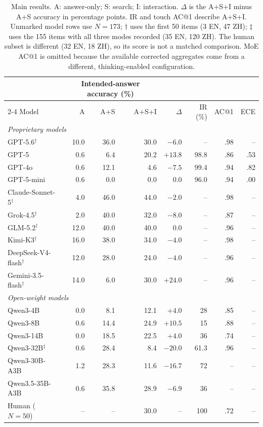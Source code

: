 \begin{table}[t]
\centering
\small
\begin{tabular*}{\textwidth}{@{\extracolsep{\fill}}lrrrrrrr@{}}
\toprule
& \multicolumn{3}{c}{Intended-answer accuracy (\%)} & & & & \\
\cmidrule(lr){2-4}
Model & A & A+S & A+S+I & $\Delta$ & IR (\%) & AC@1 & ECE \\
\midrule
\multicolumn{8}{l}{\textit{Proprietary models}} \\
GPT-5.6$^{\dagger}$           & 10.0 & 36.0 & 30.0 & $-6.0$  & -- & .98 & -- \\
GPT-5                         & 0.6 & 6.4 & 20.2 & $+13.8$ & 98.8 & .86 & .53 \\
GPT-4o                        & 0.6 & 12.1 & 4.6 & $-7.5$ & 99.4 & .94 & .82 \\
GPT-5-mini                    & 0.6 & 0.0 & 0.0 & $0.0$ & 96.0 & .94 & .00 \\
Claude-Sonnet-5$^{\dagger}$   & 4.0 & 46.0 & 44.0 & $-2.0$ & -- & .98 & -- \\
Grok-4.5$^{\dagger}$         & 2.0 & 40.0 & 32.0 & $-8.0$ & -- & .87 & -- \\
GLM-5.2$^{\dagger}$          & 12.0 & 40.0 & 40.0 & $0.0$ & -- & .96 & -- \\
Kimi-K3$^{\dagger}$          & 16.0 & 38.0 & 34.0 & $-4.0$ & -- & .98 & -- \\
DeepSeek-V4-flash$^{\dagger}$ & 12.0 & 28.0 & 24.0 & $-4.0$ & -- & .96 & -- \\
Gemini-3.5-flash$^{\dagger}$  & 14.0 & 6.0 & 30.0 & $+24.0$ & -- & .96 & -- \\
\midrule
\multicolumn{8}{l}{\textit{Open-weight models}} \\
Qwen3-4B       & 0.0 & 8.1 & 12.1 & $+4.0$ & 28 & .85 & -- \\
Qwen3-8B       & 0.6 & 14.4 & 24.9 & $+10.5$ & 15 & .88 & -- \\
Qwen3-14B      & 0.0 & 18.5 & 22.5 & $+4.0$ & 36 & .74 & -- \\
Qwen3-32B$^{\ddagger}$ & 0.6 & 28.4 & 8.4 & $-20.0$ & 61.3 & .96 & -- \\
Qwen3-30B-A3B  & 1.2 & 28.3 & 11.6 & $-16.7$ & 72 & -- & -- \\
Qwen3.5-35B-A3B & 0.6 & 35.8 & 28.9 & $-6.9$ & 36 & -- & -- \\
\midrule
Human ($N=50$) & -- & -- & 30.0 & -- & 100 & .72 & -- \\
\bottomrule
\end{tabular*}
\caption{Main results. A: answer-only; S: search; I: interaction. $\Delta$ is the A+S+I minus A+S accuracy in percentage points. IR and touch AC@1 describe A+S+I. Unmarked model rows use $N=173$; $\dagger$ uses the first 50 items (3 EN, 47 ZH); $\ddagger$ uses the 155 items with all three modes recorded (35 EN, 120 ZH). The human subset is different (32 EN, 18 ZH), so its score is not a matched comparison. MoE AC@1 is omitted because the available corrected aggregates come from a different, thinking-enabled configuration.}
\label{tab:main}
\end{table}

